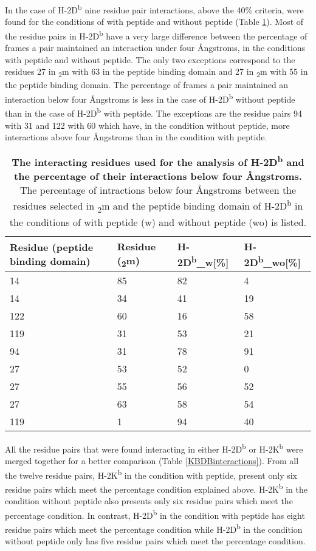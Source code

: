 \documentclass[11pt,twocolumn]{article}
\newcommand{\db}{H-2D\textsuperscript{b}\xspace}
\newcommand{\dbw}{H-2D\textsuperscript{b}\_w\xspace}
\newcommand{\dbwo}{H-2D\textsuperscript{b}\_wo\xspace}
\newcommand{\kb}{H-2K\textsuperscript{b}\xspace}
\newcommand{\angstr}{{\AA}ngstroms\xspace}
\newcommand{\btm}{\textbeta\textsubscript{2}m\xspace}
\begin{document}
In the case of \db nine residue pair interactions, above the 40\% criteria, were found for the conditions of with peptide and without peptide (Table \ref{DBinteractions}). Most of the residue pairs in \db have a very large difference between the percentage of frames a pair maintained an interaction under four \angstr,  in the conditions with peptide and  without peptide.    
The only two exceptions correspond to the residues 27 in \btm with 63 in the peptide binding domain and 27 in \btm with 55 in the peptide binding domain. The percentage of frames a pair maintained an interaction below four \angstr is less in the case of \db without peptide than in the case of \db with peptide. The exceptions are the residue pairs 94 with 31 and 122 with 60 which have, in the condition without peptide, more interactions above four \angstr than in the condition with peptide.  
 
 
 
\begin{table}[H]
\caption{\textbf{The interacting residues used for the analysis of \db and the percentage of their interactions below four \angstr. } The percentage of intractions below four \angstr between the residues selected in \btm and the peptide binding domain of \db in the conditions of with peptide (w) and without peptide (wo) is listed.}
\label{DBinteractions}
\begin{tabularx}{\linewidth}{|X|X|X|X|}  \hline
Residue (peptide binding domain)&Residue (\btm)&\dbw [\%]&\dbwo [\%]\\ \hline
14&85&82&4\\ \hline
14&34&41&19\\ \hline
122&60&16&58\\ \hline
119&31&53&21\\ \hline
94&31&78&91\\ \hline
27&53&52&0\\ \hline
27&55&56&52\\ \hline
27&63&58&54\\ \hline
119&1&94&40\\ \hline
\end{tabularx}
\end{table}


All the residue pairs that were found interacting in either \db or \kb were merged together for a better comparison (Table \ref{KBDBinteractions}). From all the twelve residue pairs, \kb in the condition with peptide, present only six residue pairs which meet the percentage condition explained above. \kb in the condition without peptide also presents only six residue pairs which meet the percentage condition. In contrast, \db in the condition with peptide has eight residue pairs which meet the percentage condition while \db in the condition without peptide only has five residue pairs which meet the percentage condition. 
\end{document}
